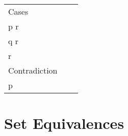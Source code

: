 \documentclass[main.tex]{subfiles}
\begin{document}
\begin{table}[h]
\begin{tabular}{lrr}
		\midrule
		Cases & & \(\begin{aligned} p \lor q \\ p \Rightarrow r \\ q \Rightarrow r \\ \therefore r \end{aligned}\) \\
		\midrule
		Contradiction & & \(\begin{aligned} \lnot p \Rightarrow \cont \\ \therefore p \end{aligned}\) \\
		\bottomrule
	\end{tabular}
\end{table}
\pagebreak

\section{Set Equivalences}
\end{document}
